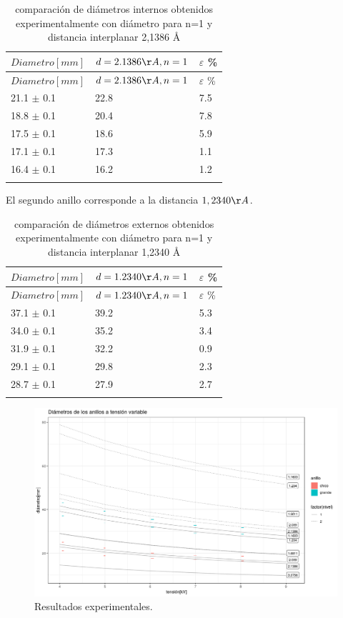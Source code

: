 \documentclass[]{article}
\begin{document}
\begin{longtable}[]{@{}lll@{}}
\toprule
\(Diametro[mm]\) & \(d=2.1386 \AA, n=1\) & \(\varepsilon\)
\%\tabularnewline
\midrule
\endfirsthead
\toprule
\(Diametro[mm]\) & \(d=2.1386 \AA, n=1\) & \(\varepsilon\)
\%\tabularnewline
\midrule
\endhead
21.1 \(\pm\) 0.1 & 22.8 & 7.5\tabularnewline
18.8 \(\pm\) 0.1 & 20.4 & 7.8\tabularnewline
17.5 \(\pm\) 0.1 & 18.6 & 5.9\tabularnewline
17.1 \(\pm\) 0.1 & 17.3 & 1.1\tabularnewline
16.4 \(\pm\) 0.1 & 16.2 & 1.2\tabularnewline
\bottomrule
\caption{comparación de diámetros internos obtenidos experimentalmente
con diámetro para n=1 y distancia interplanar 2,1386 Å}\tabularnewline
\end{longtable}

El segundo anillo corresponde a la distancia \(1,2340 \AA\).

\begin{longtable}[]{@{}lll@{}}
\toprule
\(Diametro[mm]\) & \(d=1.2340 \AA, n=1\) & \(\varepsilon\)
\%\tabularnewline
\midrule
\endfirsthead
\toprule
\(Diametro[mm]\) & \(d=1.2340 \AA, n=1\) & \(\varepsilon\)
\%\tabularnewline
\midrule
\endhead
37.1 \(\pm\) 0.1 & 39.2 & 5.3\tabularnewline
34.0 \(\pm\) 0.1 & 35.2 & 3.4\tabularnewline
31.9 \(\pm\) 0.1 & 32.2 & 0.9\tabularnewline
29.1 \(\pm\) 0.1 & 29.8 & 2.3\tabularnewline
28.7 \(\pm\) 0.1 & 27.9 & 2.7\tabularnewline
\bottomrule
\caption{comparación de diámetros externos obtenidos experimentalmente
con diámetro para n=1 y distancia interplanar 1,2340 \AA}\tabularnewline
\end{longtable}

\begin{figure}[H]
\centering
\includegraphics{resultados_experimentales.png}
\caption{Resultados experimentales.}
\end{figure}
\end{document}
